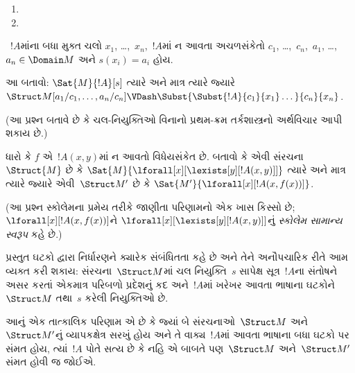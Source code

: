 \begin{prob}
\begin{enumerate}
\item %

\item %
\end{enumerate}
~$!A$માંના બધા મુક્ત ચલો $x_1$, \dots,~$x_n$,~$!A$માં ન
આવતા અચળસંકેતો $c_1$, \dots,~$c_n$,~$a_1$, \dots,
$a_n \in \Domain M$ અને $s(x_i)=a_i$ હોય.

આ બતાવો:
$\Sat{M}{!A}[s]$ ત્યારે અને માત્ર ત્યારે જ્યારે
$\Struct M[a_1/c_1,\dots,a_n/c_n]
\VDash \Subst{\Subst{!A}{c_1}{x_1}\dots}{c_n}{x_n}$.

(આ પ્રશ્ન બતાવે છે કે ચલ-નિયુક્તિઓ વિનાનો પ્રથમ-ક્રમ તર્કશાસ્ત્રનો
અર્થવિચાર આપી શકાય છે.)
\end{prob}

\begin{prob}
ધારો કે $f$ એ~$!A(x,y)$માં ન આવતો વિધેયસંકેત છે. બતાવો કે એવી
સંરચના~$\Struct{M}$ છે કે
$\Sat{M}{\lforall[x][\lexists[y][!A(x,y)]]}$ ત્યારે અને માત્ર ત્યારે
જ્યારે એવી~$\Struct M'$ છે કે
$\Sat{M'}{\lforall[x][!A(x,f(x))]}$.

(આ પ્રશ્ન સ્કોલેમના પ્રમેય તરીકે જાણીતા પરિણામનો એક ખાસ કિસ્સો છે;
$\lforall[x][!A(x,f(x))]$ને
$\lforall[x][\lexists[y][!A(x,y)]]$નું \emph{સ્કોલેમ સામાન્ય સ્વરૂપ}
કહે છે.)
\end{prob}
\endgroup


\begingroup
\makeatletter{}\makeatother


\label{guunit:OLP-0165}


\begin{explain}
પ્રસ્તુત ઘટકો દ્વારા નિર્ધારણને ક્યારેક સંબંધિતતા કહે છે અને તેને
અનૌપચારિક રીતે આમ વ્યક્ત કરી શકાય: સંરચના~$\Struct M$માં
ચલ નિયુક્તિ~$s$ સાપેક્ષ સૂત્ર~$!A$ના સંતોષને અસર કરતાં
એકમાત્ર પરિબળો પ્રદેશનું કદ અને~$!A$માં ખરેખર આવતા ભાષાના ઘટકોને
~$\Struct M$ તથા~$s$ કરેલી નિયુક્તિઓ છે.

આનું એક તાત્કાલિક પરિણામ એ છે કે જ્યાં બે સંરચનાઓ~$\Struct M$
અને~$\Struct M'$નું વ્યાપકક્ષેત્ર સરખું હોય અને તે વાક્ય~$!A$માં આવતા
ભાષાના બધા ઘટકો પર સંમત હોય, ત્યાં~$!A$ પોતે સત્ય છે કે નહિ એ બાબતે
પણ~$\Struct M$ અને~$\Struct M'$ સંમત હોવી જ જોઈએ.
\end{explain}

